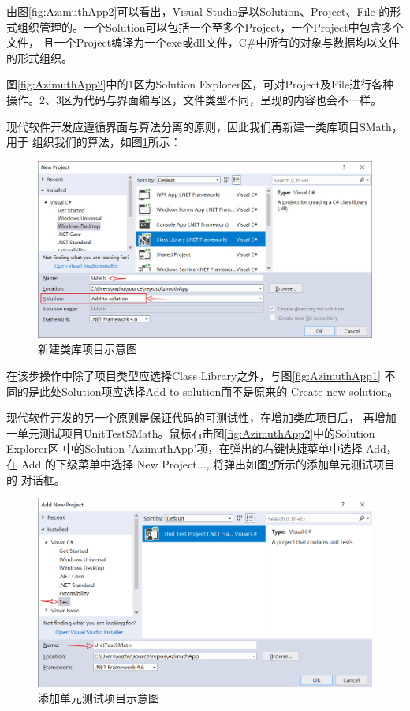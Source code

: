 由图\ref{fig:AzimuthApp2}可以看出，Visual Studio是以Solution、Project、File
的形式组织管理的。一个Solution可以包括一个至多个Project，一个Project中包含多个文件，
且一个Project编译为一个exe或dll文件，C\#中所有的对象与数据均以文件的形式组织。

图\ref{fig:AzimuthApp2}中的1区为Solution Explorer区，可对Project及File进行各种
操作。2、3区为代码与界面编写区，文件类型不同，呈现的内容也会不一样。

现代软件开发应遵循界面与算法分离的原则，因此我们再新建一类库项目SMath，用于
组织我们的算法，如图\ref{fig:AzimuthApp3}所示：

\begin{figure}[htbp]
    \centering
    \includegraphics[scale=0.6]{chapter/surveybase/AzimuthApp3.png}
    \caption{新建类库项目示意图}
    \label{fig:AzimuthApp3}
\end{figure}

在该步操作中除了项目类型应选择Class Library之外，与图\ref{fig:AzimuthApp1}
不同的是此处Solution项应选择Add to solution而不是原来的 Create new solution。

现代软件开发的另一个原则是保证代码的可测试性，在增加类库项目后，
再增加一单元测试项目UnitTestSMath。鼠标右击图\ref{fig:AzimuthApp2}中的Solution Explorer区
中的Solution 'AzimuthApp'项，在弹出的右键快捷菜单中选择 Add，
在 Add 的下级菜单中选择 New Project..., 将弹出如图\ref{fig:AzimuthApp6}所示的添加单元测试项目的
对话框。

\begin{figure}[htbp]
    \centering
    \includegraphics[scale=0.6]{chapter/surveybase/AzimuthApp6.png}
    \caption{添加单元测试项目示意图}
    \label{fig:AzimuthApp6}
\end{figure}

